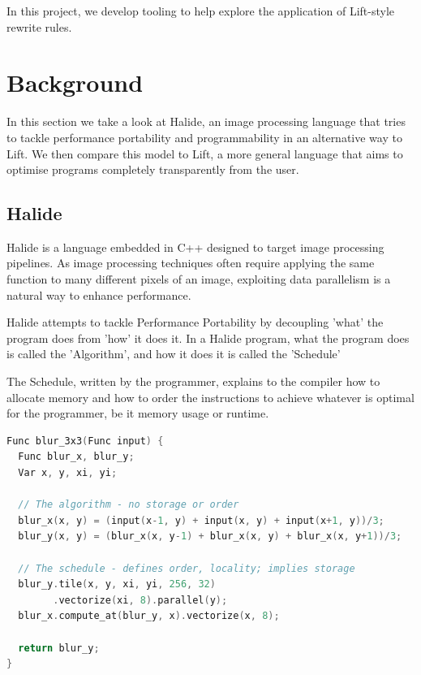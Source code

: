\documentclass{l4proj}
\begin{document}
In this project, we develop tooling to help explore the application of Lift-style rewrite rules.

\chapter{Background} \label{background}

In this section we take a look at Halide, an image processing language that tries to tackle performance portability and programmability in an alternative way to Lift. We then compare this model to Lift, a more general language that aims to optimise programs completely transparently from the user.


\section{Halide}

Halide is a language embedded in C++ designed to target image processing pipelines. As image processing techniques often require applying the same function to many different pixels of an image, exploiting data parallelism is a natural way to enhance performance.

Halide attempts to tackle Performance Portability by decoupling 'what' the program does from 'how' it does it. In a Halide program, what the program does is called the 'Algorithm', and how it does it is called the 'Schedule'

The Schedule, written by the programmer, explains to the compiler how to allocate memory and how to order the instructions to achieve whatever is optimal for the programmer, be it memory usage or runtime.

\begin{lstlisting}[caption={A Halide program for blurring an image\citep{Halide_Website}}, language={C++}]
Func blur_3x3(Func input) {
  Func blur_x, blur_y;
  Var x, y, xi, yi;

  // The algorithm - no storage or order
  blur_x(x, y) = (input(x-1, y) + input(x, y) + input(x+1, y))/3;
  blur_y(x, y) = (blur_x(x, y-1) + blur_x(x, y) + blur_x(x, y+1))/3;

  // The schedule - defines order, locality; implies storage
  blur_y.tile(x, y, xi, yi, 256, 32)
        .vectorize(xi, 8).parallel(y);
  blur_x.compute_at(blur_y, x).vectorize(x, 8);

  return blur_y;
}
\end{lstlisting}
\end{document}
